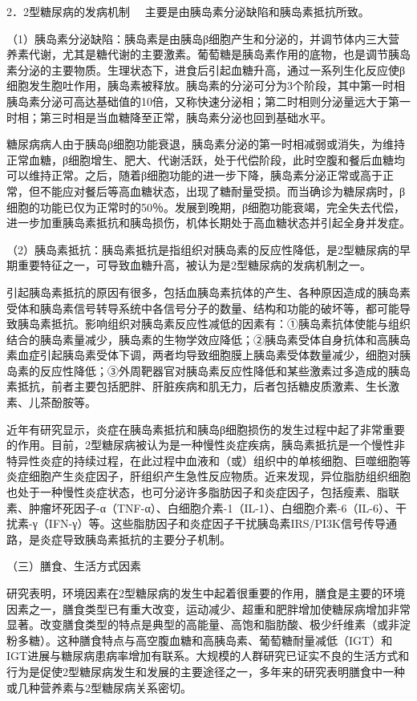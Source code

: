 {2．2型糖尿病的发病机制} 　主要是由胰岛素分泌缺陷和胰岛素抵抗所致。

（1）胰岛素分泌缺陷：胰岛素是由胰岛β细胞产生和分泌的，并调节体内三大营养素代谢，尤其是糖代谢的主要激素。葡萄糖是胰岛素作用的底物，也是调节胰岛素分泌的主要物质。生理状态下，进食后引起血糖升高，通过一系列生化反应使β细胞发生胞吐作用，胰岛素被释放。胰岛素的分泌可分为3个阶段，其中第一时相胰岛素分泌可高达基础值的10倍，又称快速分泌相；第二时相则分泌量远大于第一时相；第三时相是当血糖降至正常，胰岛素分泌也回到基础水平。

糖尿病病人由于胰岛β细胞功能衰退，胰岛素分泌的第一时相减弱或消失，为维持正常血糖，β细胞增生、肥大、代谢活跃，处于代偿阶段，此时空腹和餐后血糖均可以维持正常。之后，随着β细胞功能的进一步下降，胰岛素分泌正常或高于正常，但不能应对餐后等高血糖状态，出现了糖耐量受损。而当确诊为糖尿病时，β细胞的功能已仅为正常时的50％。发展到晚期，β细胞功能衰竭，完全失去代偿，进一步加重胰岛素抵抗和胰岛损伤，机体长期处于高血糖状态并引起全身并发症。

（2）胰岛素抵抗：胰岛素抵抗是指组织对胰岛素的反应性降低，是2型糖尿病的早期重要特征之一，可导致血糖升高，被认为是2型糖尿病的发病机制之一。

引起胰岛素抵抗的原因有很多，包括血胰岛素抗体的产生、各种原因造成的胰岛素受体和胰岛素信号转导系统中各信号分子的数量、结构和功能的破坏等，都可能导致胰岛素抵抗。影响组织对胰岛素反应性减低的因素有：①胰岛素抗体使能与组织结合的胰岛素量减少，胰岛素的生物学效应降低；②胰岛素受体自身抗体和高胰岛素血症引起胰岛素受体下调，两者均导致细胞膜上胰岛素受体数量减少，细胞对胰岛素的反应性降低；③外周靶器官对胰岛素反应性降低和某些激素过多造成的胰岛素抵抗，前者主要包括肥胖、肝脏疾病和肌无力，后者包括糖皮质激素、生长激素、儿茶酚胺等。

近年有研究显示，炎症在胰岛素抵抗和胰岛β细胞损伤的发生过程中起了非常重要的作用。目前，2型糖尿病被认为是一种慢性炎症疾病，胰岛素抵抗是一个慢性非特异性炎症的持续过程，在此过程中血液和（或）组织中的单核细胞、巨噬细胞等炎症细胞产生炎症因子，肝组织产生急性反应物质。近来发现，异位脂肪组织细胞也处于一种慢性炎症状态，也可分泌许多脂肪因子和炎症因子，包括瘦素、脂联素、肿瘤坏死因子-α（TNF-α）、白细胞介素-1（IL-1）、白细胞介素-6（IL-6）、干扰素-γ（IFN-γ）等。这些脂肪因子和炎症因子干扰胰岛素IRS/PI3K信号传导通路，是炎症导致胰岛素抵抗的主要分子机制。

（三）膳食、生活方式因素

研究表明，环境因素在2型糖尿病的发生中起着很重要的作用，膳食是主要的环境因素之一，膳食类型已有重大改变，运动减少、超重和肥胖增加使糖尿病增加非常显著。改变膳食类型的特点是典型的高能量、高饱和脂肪酸、极少纤维素（或非淀粉多糖）。这种膳食特点与高空腹血糖和高胰岛素、葡萄糖耐量减低（IGT）和IGT进展与糖尿病患病率增加有联系。大规模的人群研究已证实不良的生活方式和行为是促使2型糖尿病发生和发展的主要途径之一，多年来的研究表明膳食中一种或几种营养素与2型糖尿病关系密切。

